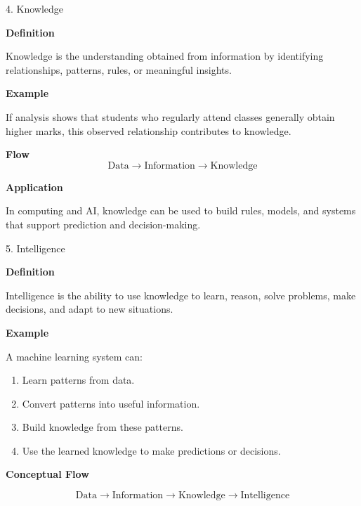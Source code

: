 \begin{frame}{4. Knowledge}

\textbf{Definition}

Knowledge is the understanding obtained from information by
identifying relationships, patterns, rules, or meaningful insights.

\vspace{0.4cm}

\textbf{Example}

If analysis shows that students who regularly attend classes
generally obtain higher marks, this observed relationship contributes
to knowledge.

\vspace{0.4cm}

\textbf{Flow}
\[
\text{Data}
\rightarrow
\text{Information}
\rightarrow
\text{Knowledge}
\]

\vspace{0.3cm}

\textbf{Application}

In computing and AI, knowledge can be used to build rules,
models, and systems that support prediction and decision-making.

\end{frame}



\begin{frame}{5. Intelligence}

\textbf{Definition}

Intelligence is the ability to use knowledge to learn, reason,
solve problems, make decisions, and adapt to new situations.

\vspace{0.4cm}

\textbf{Example}

A machine learning system can:

\begin{enumerate}
    \item Learn patterns from data.
    \item Convert patterns into useful information.
    \item Build knowledge from these patterns.
    \item Use the learned knowledge to make predictions or decisions.
\end{enumerate}

\vspace{0.4cm}

\textbf{Conceptual Flow}

\[
\boxed{
\text{Data}
\rightarrow
\text{Information}
\rightarrow
\text{Knowledge}
\rightarrow
\text{Intelligence}
}
\]

\end{frame}


